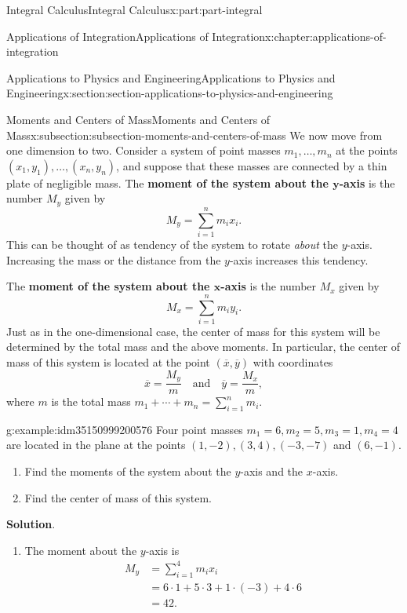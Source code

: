 \documentclass[twoside,10pt,]{book}
\newcommand{\blocktitlefont}{\relax}
\newcommand{\terminology}[1]{\textbf{#1}}
\numberwithin{equation}{part}
\newcommand{\amp}{&}
\begin{document}
\begin{partptx}{Integral Calculus}{}{Integral Calculus}{}{}{x:part:part-integral}
\begin{chapterptx}{Applications of Integration}{}{Applications of Integration}{}{}{x:chapter:applications-of-integration}
\begin{sectionptx}{Applications to Physics and Engineering}{}{Applications to Physics and Engineering}{}{}{x:section:section-applications-to-physics-and-engineering}
\begin{subsectionptx}{Moments and Centers of Mass}{}{Moments and Centers of Mass}{}{}{x:subsection:subsection-moments-and-centers-of-mass}
We now move from one dimension to two. Consider a system of point masses \(m_{1},\ldots,m_{n}\) at the points \((x_{1},y_{1}),\ldots,(x_{n},y_{n})\), and suppose that these masses are connected by a thin plate of negligible mass. The \terminology{moment of the system about the \(\boldsymbol{y}\)-axis} is the number \(M_{y}\) given by%
%
\begin{equation*}
M_{y} = \sum_{i=1}^{n}m_{i}x_{i}.
\end{equation*}
This can be thought of as tendency of the system to rotate \emph{about} the \(y\)-axis. Increasing the mass or the distance from the \(y\)-axis increases this tendency.%
\par
The \terminology{moment of the system about the \(\boldsymbol{x}\)-axis} is the number \(M_{x}\) given by%
\begin{equation*}
M_{x} = \sum_{i=1}^{n}m_{i}y_{i}.
\end{equation*}
Just as in the one-dimensional case, the center of mass for this system will be determined by the total mass and the above moments. In particular, the center of mass of this system is located at the point \((\overline{x},\overline{y})\) with coordinates%
\begin{equation*}
\overline{x} = \frac{M_{y}}{m}\quad\text{and}\quad\overline{y} = \frac{M_{x}}{m},
\end{equation*}
where \(m\) is the total mass \(m_{1}+\cdots+m_{n} = \sum_{i=1}^{n}m_{i}\).%
\begin{example}{}{g:example:idm35150999200576}%
Four point masses \(m_{1} = 6,m_{2} = 5,m_{3} = 1,m_{4} = 4\) are located in the plane at the points \((1,-2),(3,4),(-3,-7)\) and \((6,-1)\).%
\begin{enumerate}
\item{}Find the moments of the system about the \(y\)-axis and the \(x\)-axis.%
\item{}Find the center of mass of this system.%
\end{enumerate}
%
\par\smallskip%
\noindent\textbf{\blocktitlefont Solution}.\hypertarget{g:solution:idm35150999197120}{}\quad{}%
\begin{enumerate}
\item{}The moment about the \(y\)-axis is%
\begin{align*}
M_{y}\amp= \sum_{i=1}^{4}m_{i}x_{i}\\
\amp= 6\cdot1+5\cdot3+1\cdot(-3)+4\cdot6\\
\amp= 42.
\end{align*}

\end{enumerate}
\end{example}
\end{subsectionptx}
\end{sectionptx}
\end{chapterptx}
\end{partptx}
\end{document}
